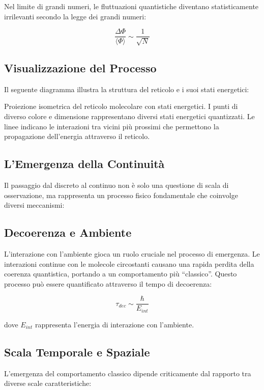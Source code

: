\documentclass[a4paper,11pt]{article}
\begin{document}
Nel limite di grandi numeri, le fluttuazioni quantistiche diventano
statisticamente irrilevanti secondo la legge dei grandi numeri:

\[\frac{\Delta \Phi}{\langle \Phi \rangle} \sim \frac{1}{\sqrt{N}}\]

\subsection{Visualizzazione del
Processo}\label{visualizzazione-del-processo}

Il seguente diagramma illustra la struttura del reticolo e i suoi stati
energetici:

Proiezione isometrica del reticolo molecolare con stati energetici. I
punti di diverso colore e dimensione rappresentano diversi stati
energetici quantizzati. Le linee indicano le interazioni tra vicini più
prossimi che permettono la propagazione dell'energia attraverso il
reticolo.

\subsection{L'Emergenza della
Continuità}\label{lemergenza-della-continuituxe0}

Il passaggio dal discreto al continuo non è solo una questione di scala
di osservazione, ma rappresenta un processo fisico fondamentale che
coinvolge diversi meccanismi:

\subsection{Decoerenza e Ambiente}\label{decoerenza-e-ambiente}

L'interazione con l'ambiente gioca un ruolo cruciale nel processo di
emergenza. Le interazioni continue con le molecole circostanti causano
una rapida perdita della coerenza quantistica, portando a un
comportamento più ``classico''. Questo processo può essere quantificato
attraverso il tempo di decoerenza:

\[\tau_{dec} \sim \frac{\hbar}{E_{int}}\]

dove \(E_{int}\) rappresenta l'energia di interazione con l'ambiente.

\subsection{Scala Temporale e
Spaziale}\label{scala-temporale-e-spaziale}

L'emergenza del comportamento classico dipende criticamente dal rapporto
tra diverse scale caratteristiche:
\end{document}
